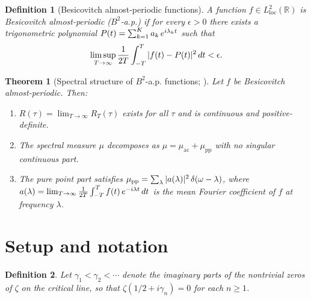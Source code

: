 \documentclass{article}
\newcommand{\tmem}[1]{{\em #1\/}}
\newtheorem{definition}{Definition}
\newtheorem{theorem}{Theorem}
\begin{document}
\begin{definition}
  [Besicovitch almost-periodic functions]\label{def:besicovitch} A function $f
  \in L^2_{\mathrm{loc}} (\mathbb{R})$ is {\tmem{Besicovitch almost-periodic}}
  ($B^2$-a.p.) if for every $\epsilon > 0$ there exists a trigonometric
  polynomial $P (t) = \sum_{k = 1}^K a_k  \hspace{0.17em} e^{i \lambda_k t}$
  such that
  \[ \limsup_{T \to \infty}  \frac{1}{2 T}  \int_{- T}^T |f (t) - P (t) |^2 
     \hspace{0.17em} dt < \epsilon . \]
\end{definition}

\begin{theorem}
  [Spectral structure of $B^2$-a.p. functions; {\cite[Ch.{\hspace{0.17em}}I,
  {\textsection}6]{Besicovitch1954}}]\label{thm:besicovitch} Let $f$ be
  Besicovitch almost-periodic. Then:
  \begin{enumerate}
    \item $R (\tau) = \lim_{T \to \infty} R_T (\tau)$ exists for all $\tau$
    and is continuous and positive-definite.
    
    \item The spectral measure $\mu$ decomposes as $\mu = \mu_{\mathrm{ac}} +
    \mu_{\mathrm{pp}}$ with no singular continuous part.
    
    \item The pure point part satisfies $\mu_{\mathrm{pp}} = \sum_{\lambda} |a
    (\lambda) |^2  \hspace{0.17em} \delta (\omega - \lambda)$, where $a
    (\lambda) = \lim_{T \to \infty}  \frac{1}{2 T}  \int_{- T}^T f (t) 
    \hspace{0.17em} e^{- i \lambda t}  \hspace{0.17em} dt$ is the mean Fourier
    coefficient of $f$ at frequency $\lambda$.
  \end{enumerate}
\end{theorem}

\section{Setup and notation}\label{sec:setup}

\begin{definition}
  \label{def:gamma}Let $\gamma_1 < \gamma_2 < \cdots$ denote the imaginary
  parts of the nontrivial zeros of $\zeta$ on the critical line, so that
  $\zeta (1 / 2 + i \gamma_n) = 0$ for each $n \ge 1$.
\end{definition}
\end{document}
